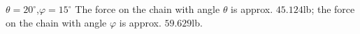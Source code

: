 {$\theta = 20^\circ$,\quad $\varphi=15^\circ$
}
{The force on the chain with angle $\theta$ is approx. $45.124$lb; the force on the chain with angle $\varphi$ is approx. $59.629$lb.
}
